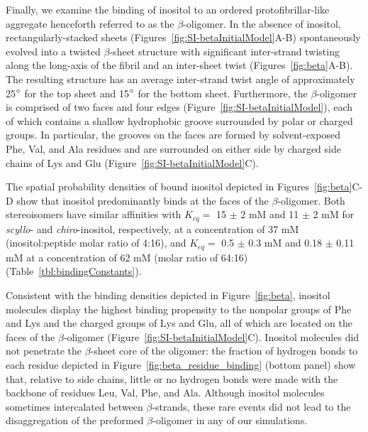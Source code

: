 Finally, we examine the binding of inositol to an ordered protofibrillar-like aggregate henceforth referred to as the $\beta$-oligomer. In the absence of inositol, rectangularly-stacked sheets (Figures~\ref{fig:SI-betaInitialModel}A-B) spontaneously evolved into a twisted $\beta$-sheet structure with significant inter-strand twisting along the long-axis of the fibril and an inter-sheet twist (Figures~\ref{fig:beta}A-B). The resulting structure has an average inter-strand twist angle of approximately 25$^\circ$ for the top sheet and 15$^\circ$ for the bottom sheet. Furthermore, the $\beta$-oligomer is comprised of two faces and four edges (Figure~\ref{fig:SI-betaInitialModel}), 
each of which contains a shallow hydrophobic groove surrounded by polar or charged groups.  In particular, the grooves on the faces are formed by solvent-exposed Phe, Val, and Ala residues and are surrounded on either side by charged side chains of Lys and Glu (Figure~\ref{fig:SI-betaInitialModel}C).

The spatial probability densities of bound inositol depicted in Figures~\ref{fig:beta}C-D show that inositol predominantly binds at the faces of the $\beta$-oligomer. Both stereoisomers have similar affinities with $K_{eq}=$ 15 $\pm$ 2 mM and 11 $\pm$ 2 mM for \emph{scyllo}- and \emph{chiro}-inositol, respectively, at a concentration of 37 mM (inositol:peptide molar ratio of 4:16), and $K_{eq}=$ 0.5 $\pm$ 0.3 mM and 0.18 $\pm$ 0.11 mM at a concentration of 62 mM (molar ratio of 64:16) (Table~\ref{tbl:bindingConstants}).   

Consistent with the binding densities depicted in Figure~\ref{fig:beta}, inositol molecules display the highest binding propensity to the nonpolar groups of Phe and Lys and the charged groups of Lys and Glu, all of which are located on the faces of the $\beta$-oligomer (Figure~\ref{fig:SI-betaInitialModel}C). 
Inositol molecules did not penetrate the $\beta$-sheet core of the oligomer: the fraction of hydrogen bonds to each residue depicted in Figure~\ref{fig:beta_residue_binding} (bottom panel) show that, relative to side chains, little or no hydrogen bonds were made with the backbone of residues Leu, Val, Phe, and Ala. Although inositol molecules sometimes intercalated between $\beta$-strands, these rare events did not lead to the disaggregation of the preformed $\beta$-oligomer in any of our simulations.

